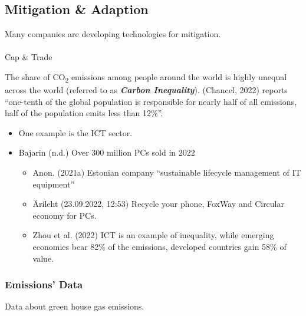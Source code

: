 \documentclass[
  letterpaper,
  DIV=11,
  numbers=noendperiod]{scrartcl}
\makeatletter
\let\oldparagraph\paragraph
\renewcommand{\paragraph}{
    \@ifstar
      \xxxParagraphStar
      \xxxParagraphNoStar
  }
\newcommand{\xxxParagraphStar}[1]{\oldparagraph*{#1}\mbox{}}
\newcommand{\xxxParagraphNoStar}[1]{\oldparagraph{#1}\mbox{}}
\providecommand{\tightlist}{%
  \setlength{\itemsep}{0pt}\setlength{\parskip}{0pt}}\usepackage{longtable,booktabs,array}
\makeatother
\begin{document}
\subsection{Mitigation \& Adaption}\label{mitigation-adaption}

Many companies are developing technologies for mitigation.

\paragraph{Cap \& Trade}\label{cap-trade}

The share of CO\textsubscript{2} emissions among people around the world
is highly unequal across the world (referred to as \textbf{\emph{Carbon
Inequality}}). (Chancel, 2022) reports ``one-tenth of the global
population is responsible for nearly half of all emissions, half of the
population emits less than 12\%''.

\begin{itemize}
\item
  One example is the ICT sector.
\item
  Bajarin (n.d.) Over 300 million PCs sold in 2022

  \begin{itemize}
  \tightlist
  \item
    Anon. (2021a) Estonian company ``sustainable lifecycle management of
    IT equipment''
  \item
    Ärileht (23.09.2022, 12:53) Recycle your phone, FoxWay and Circular
    economy for PCs.
  \item
    Zhou et al. (2022) ICT is an example of inequality, while emerging
    economies bear 82\% of the emissions, developed countries gain 58\%
    of value.
  \end{itemize}
\end{itemize}

\subsubsection{Emissions' Data}\label{emissions-data}

Data about green house gas emissions.
\end{document}
